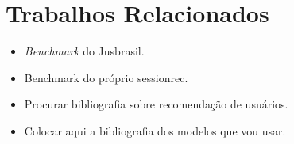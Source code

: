 \section{Trabalhos Relacionados}
\begin{itemize}
    \item \textit{Benchmark} do Jusbrasil.
    \item Benchmark do próprio sessionrec.
    \item Procurar bibliografia sobre recomendação de usuários.
    \item Colocar aqui a bibliografia dos modelos que vou usar.
\end{itemize}
    \vspace{0.4cm}